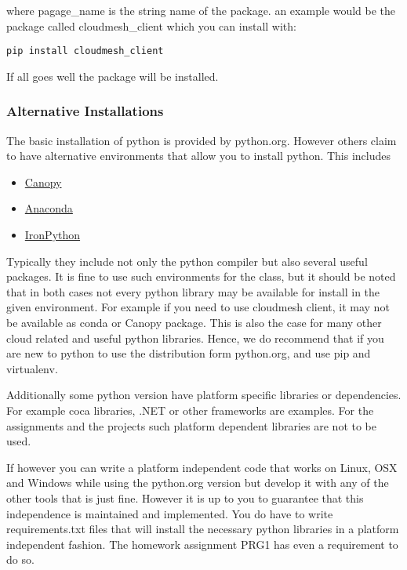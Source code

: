 where pagage\_name is the string name of the package. an example would
be the package called cloudmesh\_client which you can install with:

\begin{verbatim}
pip install cloudmesh_client
\end{verbatim}

If all goes well the package will be installed.

\subsubsection{Alternative
Installations}\label{alternative-installations}

The basic installation of python is provided by python.org. However
others claim to have alternative environments that allow you to install
python. This includes

\begin{itemize}
\tightlist
\item
  \href{https://store.enthought.com/downloads/\#default}{Canopy}
\item
  \href{https://www.continuum.io/downloads}{Anaconda}
\item
  \href{http://ironpython.net/}{IronPython}
\end{itemize}

Typically they include not only the python compiler but also several
useful packages. It is fine to use such environments for the class, but
it should be noted that in both cases not every python library may be
available for install in the given environment. For example if you need
to use cloudmesh client, it may not be available as conda or Canopy
package. This is also the case for many other cloud related and useful
python libraries. Hence, we do recommend that if you are new to python
to use the distribution form python.org, and use pip and virtualenv.

Additionally some python version have platform specific libraries or
dependencies. For example coca libraries, .NET or other frameworks are
examples. For the assignments and the projects such platform dependent
libraries are not to be used.

If however you can write a platform independent code that works on
Linux, OSX and Windows while using the python.org version but develop it
with any of the other tools that is just fine. However it is up to you
to guarantee that this independence is maintained and implemented. You
do have to write requirements.txt files that will install the necessary
python libraries in a platform independent fashion. The homework
assignment PRG1 has even a requirement to do so.

